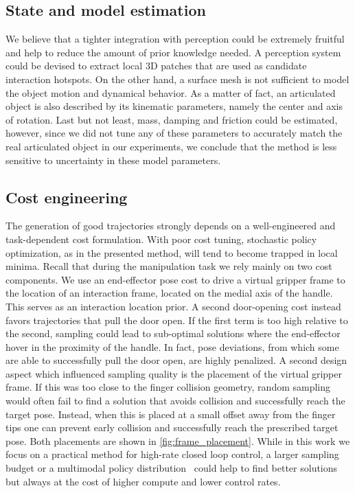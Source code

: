 \subsection{State and model estimation}
We believe that a tighter integration with perception could be extremely fruitful and help to reduce the amount of prior knowledge needed. A perception system could be devised to extract local 3D patches that are used as candidate interaction hotspots. On the other hand, a surface mesh is not sufficient to model the object motion and dynamical behavior. As a matter of fact, an articulated object is also described by its kinematic parameters, namely the center and axis of rotation. Last but not least, mass, damping and friction could be estimated, however, since we did not tune any of these parameters to accurately match the real articulated object in our experiments, we conclude that the method is less sensitive to uncertainty in these model parameters.

\subsection{Cost engineering}
The generation of good trajectories strongly depends on a well-engineered and task-dependent cost formulation. With poor cost tuning, stochastic policy optimization, as in the presented method, will tend to become trapped in local minima. Recall that during the manipulation task we rely mainly on two cost components. We use an end-effector pose cost to drive a virtual gripper frame to the location of an interaction frame, located on the medial axis of the handle. This serves as an interaction location prior. A second door-opening cost instead favors trajectories that pull the door open. If the first term is too high relative to the second, sampling could lead to sub-optimal solutions where the end-effector hover in the proximity of the handle. In fact, pose deviations, from which some are able to successfully pull the door open, are highly penalized. A second design aspect which influenced sampling quality is the placement of the virtual gripper frame. If this was too close to the finger collision geometry, random sampling would often fail to find a solution that avoids collision and successfully reach the target pose. Instead, when this is placed at a small offset away from the finger tips one can prevent early collision and successfully reach the prescribed target pose. Both placements are shown in \fig \ref{fig:frame_placement}. While in this work we focus on a practical method for high-rate closed loop control, a larger sampling budget or a multimodal policy distribution~\cite{lambert_stein_2020} could help to find better solutions but always at the cost of higher compute and lower control rates.

